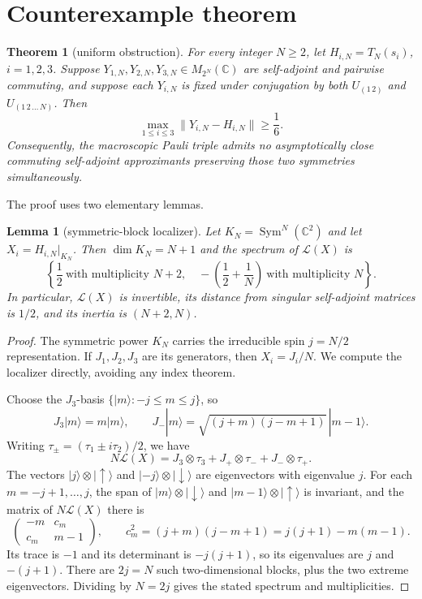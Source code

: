 \documentclass[11pt]{article}
\newtheorem{theorem}{Theorem}
\newtheorem{lemma}{Lemma}
\newcommand{\C}{\mathbb C}
\newcommand{\Sym}{\operatorname{Sym}}
\begin{document}
\section{Counterexample theorem}

\begin{theorem}[uniform obstruction]\label{thm:main}
For every integer $N\ge2$, let $H_{i,N}=T_N(s_i)$, $i=1,2,3$.  Suppose
$Y_{1,N},Y_{2,N},Y_{3,N}\in M_{2^N}(\C)$ are self-adjoint and pairwise
commuting, and suppose each $Y_{i,N}$ is fixed under conjugation by both
$U_{(1\,2)}$ and $U_{(1\,2\,\ldots\,N)}$.  Then
\[
 \max_{1\le i\le3}\|Y_{i,N}-H_{i,N}\|\ge \frac16.
\]
Consequently, the macroscopic Pauli triple admits no asymptotically close
commuting self-adjoint approximants preserving those two symmetries
simultaneously.
\end{theorem}

The proof uses two elementary lemmas.

\begin{lemma}[symmetric-block localizer]\label{lem:spin}
Let $K_N=\Sym^N(\C^2)$ and let $X_i=H_{i,N}|_{K_N}$.  Then
$\dim K_N=N+1$ and the spectrum of $\mathcal L(X)$ is
\[
 \left\{\frac12\ \text{with multiplicity }N+2,\quad
 -\left(\frac12+\frac1N\right)\ \text{with multiplicity }N\right\}.
\]
In particular, $\mathcal L(X)$ is invertible, its distance from singular
self-adjoint matrices is $1/2$, and its inertia is $(N+2,N)$.
\end{lemma}

\begin{proof}
The symmetric power $K_N$ carries the irreducible spin $j=N/2$
representation.  If $J_1,J_2,J_3$ are its generators, then
$X_i=J_i/N$.  We compute the localizer directly, avoiding any index theorem.

Choose the $J_3$-basis $\{|m\rangle:-j\le m\le j\}$, so
\[
 J_3|m\rangle=m|m\rangle,\qquad
 J_-|m\rangle=\sqrt{(j+m)(j-m+1)}\,|m-1\rangle.
\]
Writing $\tau_\pm=(\tau_1\pm i\tau_2)/2$, we have
\[
 N\mathcal L(X)=J_3\otimes\tau_3+J_+\otimes\tau_-+J_-\otimes\tau_+.
\]
The vectors $|j\rangle\otimes|\!\uparrow\rangle$ and
$|-j\rangle\otimes|\!\downarrow\rangle$ are eigenvectors with eigenvalue
$j$.  For each $m=-j+1,\ldots,j$, the span of
$|m\rangle\otimes|\!\downarrow\rangle$ and
$|m-1\rangle\otimes|\!\uparrow\rangle$ is invariant, and the matrix of
$N\mathcal L(X)$ there is
\[
 \begin{pmatrix}
 -m & c_m\\ c_m&m-1
 \end{pmatrix},\qquad
 c_m^2=(j+m)(j-m+1)=j(j+1)-m(m-1).
\]
Its trace is $-1$ and its determinant is $-j(j+1)$, so its eigenvalues are
$j$ and $-(j+1)$.  There are $2j=N$ such two-dimensional blocks, plus the two
extreme eigenvectors.  Dividing by $N=2j$ gives the stated spectrum and
multiplicities.
\end{proof}
\end{document}
